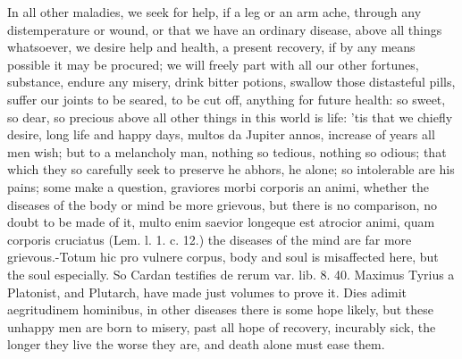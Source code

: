 In all other maladies, we seek for help, if a leg or an arm ache,
through any distemperature or wound, or that we have an ordinary
disease, above all things whatsoever, we desire help and health, a
present recovery, if by any means possible it may be procured; we will
freely part with all our other fortunes, substance, endure any misery,
drink bitter potions, swallow those distasteful pills, suffer our
joints to be seared, to be cut off, anything for future health: so
sweet, so dear, so precious above all other things in this world is
life: 'tis that we chiefly desire, long life and happy days,
multos da Jupiter annos, increase of years all men wish; but to a
melancholy man, nothing so tedious, nothing so odious; that which they
so carefully seek to preserve he abhors, he alone; so intolerable
are his pains; some make a question, graviores morbi corporis an animi,
whether the diseases of the body or mind be more grievous, but there is
no comparison, no doubt to be made of it, multo enim saevior longeque
est atrocior animi, quam corporis cruciatus (Lem. l. 1. c. 12.) the
diseases of the mind are far more grievous.-Totum hic pro vulnere
corpus, body and soul is misaffected here, but the soul especially. So
Cardan testifies de rerum var. lib. 8. 40. Maximus Tyrius a
Platonist, and Plutarch, have made just volumes to prove it. Dies
adimit aegritudinem hominibus, in other diseases there is some hope
likely, but these unhappy men are born to misery, past all hope of
recovery, incurably sick, the longer they live the worse they are, and
death alone must ease them.

